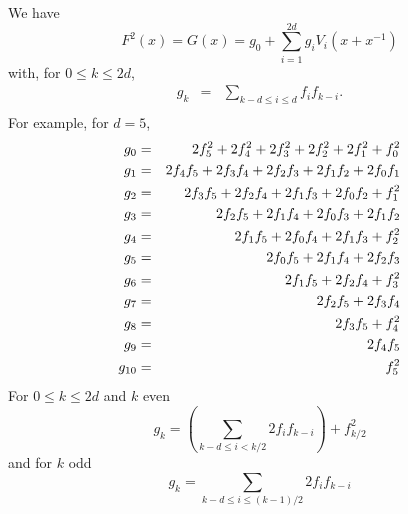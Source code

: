 \documentclass[a4paper]{article}
\begin{document}
We have 
\begin{displaymath}
  F^2(x) = G(x) = g_0 + \sum_{i=1}^{2d} g_i V_i(x+x^{-1})
\end{displaymath}
with, for $0 \leq k \leq 2d$,
\begin{eqnarray*}
  g_k 
      & = & \sum_{k-d \leq i \leq d} f_i f_{k-i}. \\
\end{eqnarray*}
For example, for $d=5$, 
\begin{eqnarray*}
g_0 & = & 2 f_{5}^2  + 2 f_{4}^2  + 2 f_{3}^2 + 2 f_{2}^2 + 2 f_{1}^2 + f_{0}^2 \\
g_1 & = & 2 f_{4} f_{5} + 2 f_{3} f_{4} + 2 f_{2} f_{3} + 2 f_{1} f_{2} + 2 f_{0} f_{1} \\
g_2 & = & 2 f_{3} f_{5} + 2 f_{2} f_{4} + 2 f_{1} f_{3} + 2 f_{0} f_{2} + f_{1}^2 \\
g_3 & = & 2 f_{2} f_{5} + 2 f_{1} f_{4} + 2 f_{0} f_{3} + 2 f_{1} f_{2} \\
g_4 & = & 2 f_{1} f_{5} + 2 f_{0} f_{4} + 2 f_{1} f_{3} + f_{2}^2 \\
g_5 & = & 2 f_{0} f_{5} + 2 f_{1} f_{4} + 2 f_{2} f_{3} \\
\pagebreak
g_6 & = & 2 f_{1} f_{5} + 2 f_{2} f_{4} + f_{3}^2 \\
g_7 & = & 2 f_{2} f_{5} + 2 f_{3} f_{4}\\
g_8 & = & 2 f_{3} f_{5} + f_{4}^2 \\
g_9 & = & 2 f_{4} f_{5} \\
g_{10} & = & f_{5}^2 \\
\end{eqnarray*}
For $0 \leq k \leq 2d$ and $k$ even
\begin{displaymath}
 g_k = \left( \sum_{k-d \leq i < k/2} 2 f_i f_{k-i} \right) + f_{k/2}^2
\end{displaymath}
and for $k$ odd
\begin{displaymath}
 g_k = \sum_{k-d \leq i \leq (k-1)/2} 2 f_i f_{k-i}
\end{displaymath}
\end{document}
